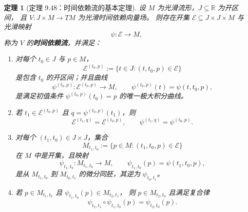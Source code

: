 \documentclass[11pt]{article}
\newtheorem{theorem}[definition]{定理}
\newcommand{\R}{\mathbb{R}}
\newcommand{\E}{\mathcal{E}}
\begin{document}
\begin{theorem}[定理 9.48：时间依赖流的基本定理]
设 $M$ 为光滑流形，$J\subseteq\R$ 为开区间，
且 $V:J\times M\to TM$ 为光滑时间依赖向量场。
则存在开集 $\E\subseteq J\times J\times M$ 与光滑映射
\[
\psi:\E\to M,
\]
称为 $V$ 的\textbf{时间依赖流}，并满足：
\begin{enumerate}[label=(\alph*)]
\item 对每个 $t_0\in J$ 与 $p\in M$，
\[
\E^{(t_0,p)}:=\{t\in J:(t,t_0,p)\in\E\}
\]
是包含 $t_0$ 的开区间；并且曲线
\[
\psi^{(t_0,p)}:\E^{(t_0,p)}\to M,\qquad
\psi^{(t_0,p)}(t)=\psi(t,t_0,p),
\]
是满足初值条件 $\psi^{(t_0,p)}(t_0)=p$ 的唯一极大积分曲线。
\item 若 $t_1\in\E^{(t_0,p)}$ 且 $q=\psi^{(t_0,p)}(t_1)$，则
\[
\E^{(t_1,q)}=\E^{(t_0,p)},\qquad \psi^{(t_1,q)}=\psi^{(t_0,p)}.
\]
\item 对每个 $(t_1,t_0)\in J\times J$，集合
\[
M_{t_1,t_0}:=\{p\in M:(t_1,t_0,p)\in\E\}
\]
在 $M$ 中是开集，且映射
\[
\psi_{t_1,t_0}:M_{t_1,t_0}\to M,\qquad
\psi_{t_1,t_0}(p)=\psi(t_1,t_0,p),
\]
是从 $M_{t_1,t_0}$ 到 $M_{t_0,t_1}$ 的微分同胚，其逆为 $\psi_{t_0,t_1}$。
\item 若 $p\in M_{t_1,t_0}$ 且 $\psi_{t_1,t_0}(p)\in M_{t_2,t_1}$，
则 $p\in M_{t_2,t_0}$ 且满足复合律
\[
\psi_{t_2,t_1}\circ\psi_{t_1,t_0}(p)=\psi_{t_2,t_0}(p).
\tag{9.18}
\]
\end{enumerate}
\end{theorem}
\end{document}
